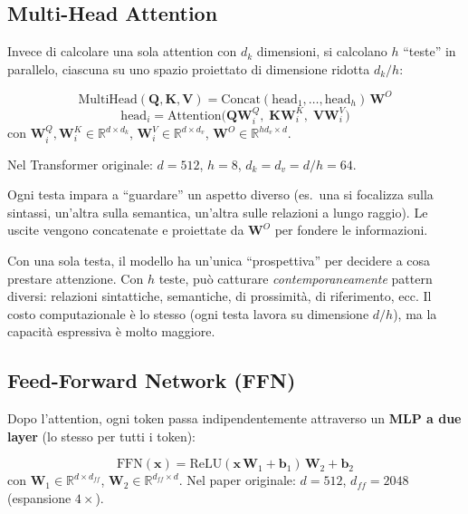 \documentclass[
  11pt,
]{article}
\begin{document}
\subsection{Multi-Head Attention}

Invece di calcolare una sola attention con $d_k$ dimensioni, si calcolano $h$ ``teste'' in parallelo, ciascuna su uno spazio proiettato di dimensione ridotta $d_k/h$:

\begin{formulabox}[title={\textbf{Multi-Head Attention}}]
\[
\text{MultiHead}(\mathbf{Q}, \mathbf{K}, \mathbf{V}) = \text{Concat}(\text{head}_1, \ldots, \text{head}_h)\,\mathbf{W}^O
\]
\[
\text{head}_i = \text{Attention}\!\bigl(\mathbf{Q}\mathbf{W}_i^Q,\;\mathbf{K}\mathbf{W}_i^K,\;\mathbf{V}\mathbf{W}_i^V\bigr)
\]
con $\mathbf{W}_i^Q, \mathbf{W}_i^K \in \mathbb{R}^{d \times d_k}$, $\mathbf{W}_i^V \in \mathbb{R}^{d \times d_v}$, $\mathbf{W}^O \in \mathbb{R}^{hd_v \times d}$.

Nel Transformer originale: $d = 512$, $h = 8$, $d_k = d_v = d/h = 64$.
\end{formulabox}

Ogni testa impara a ``guardare'' un aspetto diverso (es.\ una si focalizza sulla sintassi, un'altra sulla semantica, un'altra sulle relazioni a lungo raggio). Le uscite vengono concatenate e proiettate da $\mathbf{W}^O$ per fondere le informazioni.

\begin{notabox}[title={\textbf{Perché multi-head e non single-head?}}]
Con una sola testa, il modello ha un'unica ``prospettiva'' per decidere a cosa prestare attenzione. Con $h$ teste, può catturare \emph{contemporaneamente} pattern diversi: relazioni sintattiche, semantiche, di prossimità, di riferimento, ecc. Il costo computazionale è lo stesso (ogni testa lavora su dimensione $d/h$), ma la capacità espressiva è molto maggiore.
\end{notabox}

\subsection{Feed-Forward Network (FFN)}

Dopo l'attention, ogni token passa indipendentemente attraverso un \textbf{MLP a due layer} (lo stesso per tutti i token):

\begin{formulabox}[title={\textbf{Feed-Forward Network}}]
\[
\text{FFN}(\mathbf{x}) = \text{ReLU}(\mathbf{x}\,\mathbf{W}_1 + \mathbf{b}_1)\,\mathbf{W}_2 + \mathbf{b}_2
\]
con $\mathbf{W}_1 \in \mathbb{R}^{d \times d_{ff}}$, $\mathbf{W}_2 \in \mathbb{R}^{d_{ff} \times d}$. Nel paper originale: $d = 512$, $d_{ff} = 2048$ (espansione $4\times$).
\end{formulabox}
\end{document}
